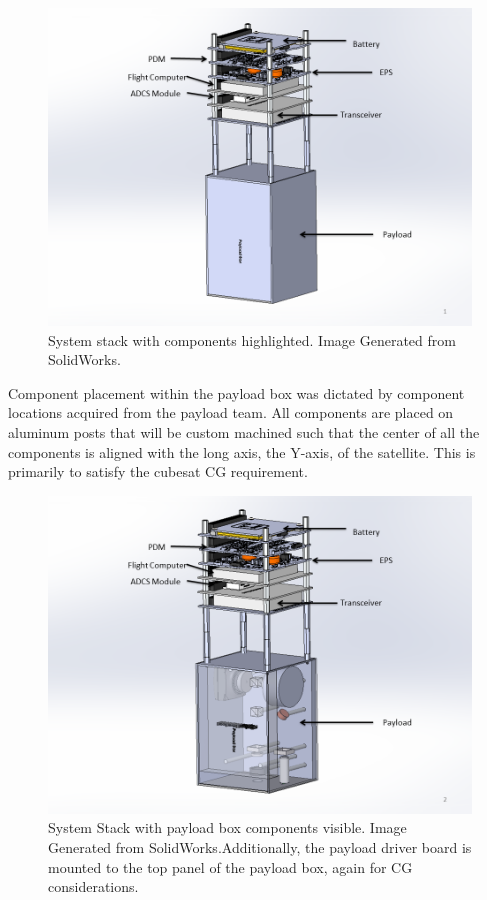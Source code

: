 \documentclass[12pt]{article}
\begin{document}
\begin{figure}[!ht]
\centering
\includegraphics[width=6in]{images/STR-8.png}
\caption{System stack with components highlighted. Image Generated from SolidWorks.}
\label{fig:str-8}
\end{figure}


Component placement within the payload box was dictated by component locations acquired from the payload team. All components are placed on aluminum posts that will be custom machined such that the center of all the components is aligned with the long axis, the Y-axis, of the satellite. This is primarily to satisfy the cubesat CG requirement.

\begin{figure}[!ht]
\centering
\includegraphics[width=6in]{images/STR-9.png}
\caption{System Stack with payload box components visible. Image Generated from SolidWorks.Additionally, the payload driver board is mounted to the top panel of the payload box, again for CG considerations.}
\label{fig:str-9}
\end{figure}
\end{document}
